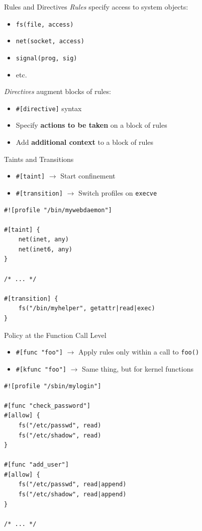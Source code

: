 \documentclass[12pt, dvipsnames]{beamer}
\begin{document}
\begin{frame}[c, fragile]{Rules and Directives}
\textit{Rules} specify access to system objects:
\begin{itemize}
    \item \lstinline[language=bpfbox]|fs(file, access)|
    \item \lstinline[language=bpfbox]|net(socket, access)|
    \item \lstinline[language=bpfbox]|signal(prog, sig)|
    \item etc.
\end{itemize}

\vfill
\textit{Directives} augment blocks of rules:
\begin{itemize}
    \item \lstinline[language=bpfbox]|#[directive]| syntax
    \item Specify \textbf{actions to be taken} on a block of rules
    \item Add \textbf{additional context} to a block of rules
\end{itemize}
\end{frame}

\begin{frame}[c, fragile]{Taints and Transitions}
\begin{itemize}
    \item \lstinline[language=bpfbox]|#[taint]|  $\rightarrow$ Start confinement
    \item \lstinline[language=bpfbox]|#[transition]|  $\rightarrow$ Switch profiles on \texttt{execve}
\end{itemize}
\vfill
\begin{lstlisting}[language=bpfbox, xleftmargin=.25\textwidth]
#![profile "/bin/mywebdaemon"]

#[taint] {
    net(inet, any)
    net(inet6, any)
}

/* ... */

#[transition] {
    fs("/bin/myhelper", getattr|read|exec)
}
\end{lstlisting}
\end{frame}

\begin{frame}[c, fragile]{Policy at the Function Call Level}
\begin{itemize}
    \item \lstinline[language=bpfbox]|#[func "foo"]|  $\rightarrow$ Apply rules only within a call to \texttt{foo()}
    \item \lstinline[language=bpfbox]|#[kfunc "foo"]|  $\rightarrow$ Same thing, but for kernel functions
\end{itemize}
\vfill
\begin{lstlisting}[language=bpfbox, xleftmargin=.25\textwidth]
#![profile "/sbin/mylogin"]

#[func "check_password"]
#[allow] {
    fs("/etc/passwd", read)
    fs("/etc/shadow", read)
}

#[func "add_user"]
#[allow] {
    fs("/etc/passwd", read|append)
    fs("/etc/shadow", read|append)
}

/* ... */
\end{lstlisting}
\end{frame}
\end{document}
